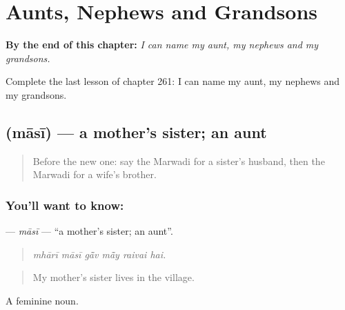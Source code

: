 
\chapter{Aunts, Nephews and Grandsons}
\label{ch:mw-aunts-nephews-and-grandsons}

\begin{chapteropening}
\textbf{By the end of this chapter:} \emph{I can name my aunt, my nephews and my grandsons.}

Complete the last lesson of chapter 261: I can name my aunt, my nephews and my grandsons.
\end{chapteropening}

\section[\texorpdfstring{\mw{मासी} (māsī)}{मासी (māsī)}]{ (māsī) — a mother's sister; an aunt}

\label{lesson:MW-C261-masi}



\begin{quote}
Before the new one: say the Marwadi for a sister's husband, then the Marwadi for a wife's brother.
\end{quote}

\subsection*{You'll want to know: }
\textbf{} — \emph{māsī} — \textquotedblleft{}a mother's sister; an aunt\textquotedblright{}.

\begin{quote}
     
\end{quote}

\begin{quote}
\emph{mhārī māsī gā̃v mā̃y raivai hai.}
\end{quote}

\begin{quote}
My mother's sister lives in the village.
\end{quote}

A feminine noun.

